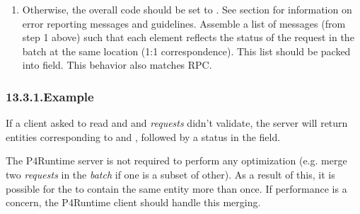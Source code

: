 \documentclass[11pt]{article}
\begin{document}
{\begin{enumerate}
\begin{enumerate}
\item{}
Otherwise, the overall code should be set to . See section
 for information
on error reporting messages and guidelines. Assemble a list of 
messages (from step 1 above) such that each element reflects the status
of the request in the batch at the same location (1:1
correspondence). This list should be packed into
 field. This behavior also matches 
RPC.%
\end{enumerate}%
\end{enumerate}%

\subsubsection{13.3.1.\hspace*{0.5em}Example}\label{sec-example}%

\noindent{}If a client asked to read  and  and  \emph{requests} didn't
validate, the server will return entities corresponding to  and , followed
by a status  in the
 field.%

The P4Runtime server is not required to perform any optimization (e.g. merge two
\emph{requests} in the \emph{batch} if one is a subset of other). As a result of this, it
is possible for the  to contain the same entity more than once. If
performance is a concern, the P4Runtime client should handle this merging.%

}
\end{document}
